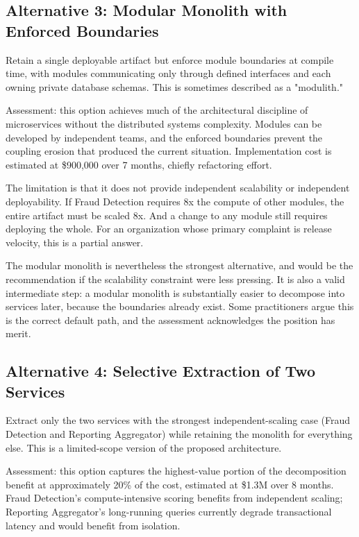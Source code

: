\subsection{Alternative 3: Modular Monolith with Enforced Boundaries}

Retain a single deployable artifact but enforce module boundaries at compile time, with modules communicating only through defined interfaces and each owning private database schemas. This is sometimes described as a "modulith."

Assessment: this option achieves much of the architectural discipline of microservices without the distributed systems complexity. Modules can be developed by independent teams, and the enforced boundaries prevent the coupling erosion that produced the current situation. Implementation cost is estimated at \$900,000 over 7 months, chiefly refactoring effort.

The limitation is that it does not provide independent scalability or independent deployability. If Fraud Detection requires 8x the compute of other modules, the entire artifact must be scaled 8x. And a change to any module still requires deploying the whole. For an organization whose primary complaint is release velocity, this is a partial answer.

The modular monolith is nevertheless the strongest alternative, and would be the recommendation if the scalability constraint were less pressing. It is also a valid intermediate step: a modular monolith is substantially easier to decompose into services later, because the boundaries already exist. Some practitioners argue this is the correct default path, and the assessment acknowledges the position has merit.

\subsection{Alternative 4: Selective Extraction of Two Services}

Extract only the two services with the strongest independent-scaling case (Fraud Detection and Reporting Aggregator) while retaining the monolith for everything else. This is a limited-scope version of the proposed architecture.

Assessment: this option captures the highest-value portion of the decomposition benefit at approximately 20\% of the cost, estimated at \$1.3M over 8 months. Fraud Detection's compute-intensive scoring benefits from independent scaling; Reporting Aggregator's long-running queries currently degrade transactional latency and would benefit from isolation.

